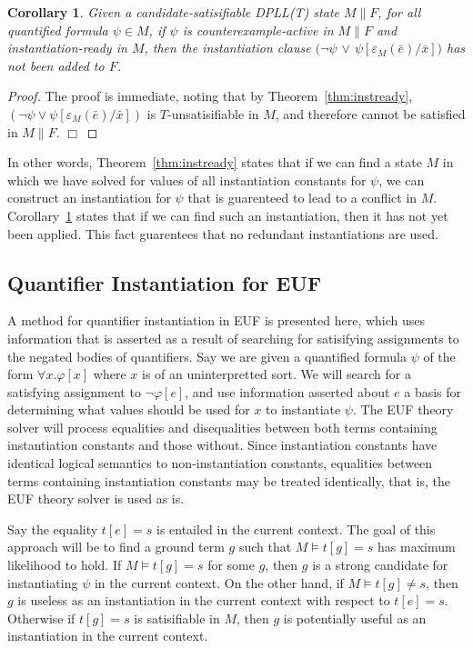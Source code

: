 \documentclass{llncs}
\newtheorem{cor}{Corollary}
\begin{document}
\begin{cor}
\label{cor:instready}
Given a candidate-satisifiable DPLL(T) state $M \parallel F$, for all quantified formula $\psi \in M$,
if $\psi$ is counterexample-active in $M \parallel F$ and instantiation-ready in $M$, then the instantiation clause $( \neg \psi$ $\vee$ $\psi[\varepsilon_{M}( \bar{e} )/\bar{x}])$ has not been added to $F$.
\end{cor}
\begin{proof}
The proof is immediate, noting that by Theorem~\ref{thm:instready}, $( \neg \psi \vee \psi[\varepsilon_{M}( \bar{e} )/\bar{x}])$ is $T$-unsatisifiable in $M$, and therefore cannot be satisfied in $M \parallel F$. $\Box$
\end{proof}

In other words, Theorem~\ref{thm:instready} states that if we can find a state $M$ in which we have solved for values of all instantiation constants for $\psi$, we can construct an instantiation for $\psi$ that is guarenteed to lead to a conflict in $M$.
Corollary~\ref{cor:instready} states that if we can find such an instantiation, then it has not yet been applied.
This fact guarentees that no redundant instantiations are used.

\subsection{Quantifier Instantiation for EUF}

A method for quantifier instantiation in EUF is presented here, which uses information that is asserted as a result of searching for satisifying assignments to the negated bodies of quantifiers.
Say we are given a quantified formula $\psi$ of the form $\forall x. \varphi[x]$ where $x$ is of an uninterpretted sort.
We will search for a satisfying assignment to $\neg \varphi[e]$, and use information asserted about $e$ a basis for determining what values should be used for $x$ to instantiate $\psi$.
The EUF theory solver will process equalities and disequalities between both terms containing instantiation constants and those without.
Since instantiation constants have identical logical semantics to non-instantiation constants, equalities between terms containing instantiation constants may be treated identically, that is, the EUF theory solver is used as is.

Say the equality $t[e] = s$ is entailed in the current context.
The goal of this approach will be to find a ground term $g$ such that $M \models t[g] = s$ has maximum likelihood to hold.
If $M \models t[g] = s$ for some $g$, then $g$ is a strong candidate for instantiating $\psi$ in the current context.
On the other hand, if $M \models t[g] \neq s$, then $g$ is useless as an instantiation in the current context with respect to $t[e] = s$.
Otherwise if $t[g] = s$ is satisifiable in $M$, then $g$ is potentially useful as an instantiation in the current context.
\end{document}

